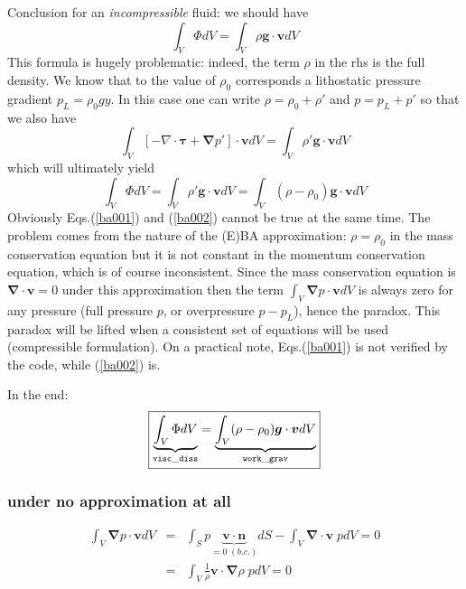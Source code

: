 Conclusion for an {\it incompressible} fluid: we should have
\begin{equation}
\int_V \Phi  dV 
=
\int_V \rho {\bm g} \cdot {\bm v} dV 
\label{ba001}
\end{equation}
This formula is hugely problematic: indeed, the term $\rho$ in the rhs is the full density. We know 
that to the value of $\rho_0$ corresponds a lithostatic pressure gradient $p_L=\rho_0 g y$. In this case one can write $\rho = \rho_0 + \rho'$ and $p=p_L + p'$
so that we also have 
\[
\int_V  \left[ -\nabla \cdot {\bm \tau}  + {\bm \nabla} p' \right] \cdot {\bm v} dV  = \int_V  \rho' {\bm g} \cdot {\bm v}dV
\]
which will ultimately yield 
\begin{equation}
\int_V \Phi  dV 
=
\int_V \rho' {\bm g} \cdot {\bm v} dV 
=
\int_V (\rho-\rho_0) {\bm g} \cdot {\bm v} dV 
\label{ba002}
\end{equation}
Obviously Eqs.(\ref{ba001}) and (\ref{ba002}) cannot be true at the same time.
The problem comes from the nature of the (E)BA approximation: $\rho=\rho_0$ in the mass conservation equation
but it is not constant in the momentum conservation equation, which is of course inconsistent. Since the mass 
conservation equation is ${\bm \nabla}\cdot{\bm v}=0$ under this approximation then the term 
$\int_V {\bm \nabla} p \cdot {\bm v} dV$ is always zero for any pressure (full pressure $p$, or overpressure $p-p_L$), 
hence the paradox. This paradox will be lifted when a consistent set of equations will be used (compressible formulation).
On a practical note, Eqs.(\ref{ba001}) is not verified by the code, while (\ref{ba002}) is.   

In the end:
\begin{equation}
\boxed{
\underbrace{\int_V \Phi  dV }_{\tt visc\_diss}
=
\underbrace{\int_V (\rho-\rho_0) {\bm g} \cdot {\bm v} dV }_{\tt work\_grav}
}
\label{ba003}
\end{equation}


\subsubsection{under no  approximation at all}

\begin{eqnarray}
\int_V {\bm \nabla} p \cdot {\bm v} dV  
&=& \int_S p \underbrace{{\bm v}\cdot {\bm n}}_{=0 \; (b.c.)} dS - \int_V {\bm \nabla}\cdot{\bm v} \; p dV = 0  \\
&=&  \int_V \frac{1}{\rho} {\bm v} \cdot {\bm \nabla} \rho \; p dV = 0  \\
\end{eqnarray}

